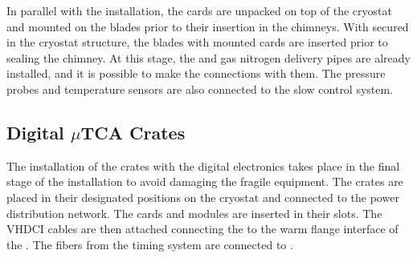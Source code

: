 In parallel with the  installation, the  cards are unpacked on top of the cryostat and mounted on the blades prior to their insertion in the chimneys.  
With  secured in the cryostat structure, the blades with mounted  cards %
are inserted prior to sealing the chimney.
At this stage, the \lar and gas nitrogen delivery pipes are already installed, and  
it is possible to make the connections with them. The pressure probes and temperature sensors are also connected to the slow control system.
 
 
\subsection{Digital $\mu$TCA Crates}
\label{sec:fddp-tpc-elec-install-utca}

The installation of the  crates with the digital electronics %
takes place in the final stage of the  installation to avoid damaging the fragile equipment. The crates are placed in their designated positions on the cryostat and connected to the power distribution network. The  cards and  modules are inserted in their slots. The VHDCI cables are then attached connecting the   to the warm flange interface of the .  The fibers from the timing system are connected to . 



